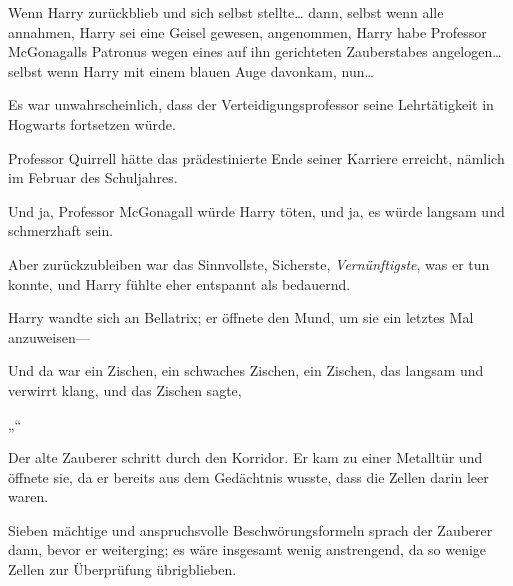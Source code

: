 Wenn Harry zurückblieb und sich selbst stellte… dann, selbst wenn alle annahmen, Harry sei eine Geisel gewesen, angenommen, Harry habe Professor McGonagalls Patronus wegen eines auf ihn gerichteten Zauberstabes angelogen… selbst wenn Harry mit einem blauen Auge davonkam, nun…

Es war unwahrscheinlich, dass der Verteidigungsprofessor seine Lehrtätigkeit in Hogwarts fortsetzen würde.

Professor Quirrell hätte das prädestinierte Ende seiner Karriere erreicht, nämlich im Februar des Schuljahres.

Und ja, Professor McGonagall würde Harry töten, und ja, es würde langsam und schmerzhaft sein.

Aber zurückzubleiben war das Sinnvollste, Sicherste, \emph{Vernünftigste}, was er tun konnte, und Harry fühlte eher entspannt als bedauernd.

Harry wandte sich an Bellatrix; er öffnete den Mund, um sie ein letztes Mal anzuweisen—

Und da war ein Zischen, ein schwaches Zischen, ein Zischen, das langsam und verwirrt klang, und das Zischen sagte,

„“

\later

Der alte Zauberer schritt durch den Korridor. Er kam zu einer Metalltür und öffnete sie, da er bereits aus dem Gedächtnis wusste, dass die Zellen darin leer waren.

Sieben mächtige und anspruchsvolle Beschwörungsformeln sprach der Zauberer dann, bevor er weiterging; es wäre insgesamt wenig anstrengend, da so wenige Zellen zur Überprüfung übrigblieben.

